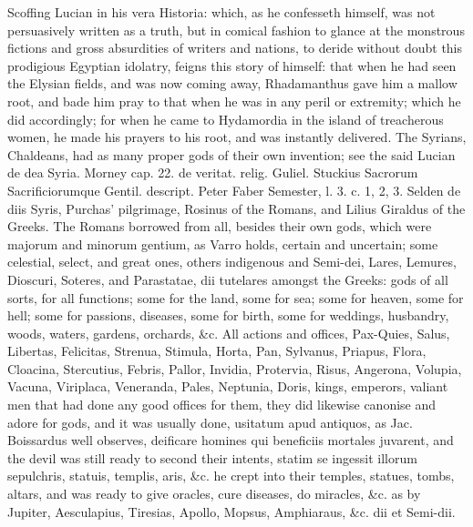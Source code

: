 {Scoffing Lucian in his vera Historia: which, as he confesseth
himself, was not persuasively written as a truth, but in comical
fashion to glance at the monstrous fictions and gross absurdities of
writers and nations, to deride without doubt this prodigious Egyptian
idolatry, feigns this story of himself: that when he had seen the
Elysian fields, and was now coming away, Rhadamanthus gave him a mallow
root, and bade him pray to that when he was in any peril or extremity;
which he did accordingly; for when he came to Hydamordia in the island
of treacherous women, he made his prayers to his root, and was
instantly delivered. The Syrians, Chaldeans, had as many proper gods of
their own invention; see the said Lucian de dea Syria. Morney cap. 22.
de veritat. relig. Guliel. Stuckius Sacrorum Sacrificiorumque
Gentil. descript. Peter Faber Semester, l. 3. c. 1, 2, 3. Selden de
diis Syris, Purchas' pilgrimage,  Rosinus of the Romans, and
Lilius Giraldus of the Greeks. The Romans borrowed from all, besides
their own gods, which were majorum and minorum gentium, as Varro holds,
certain and uncertain; some celestial, select, and great ones, others
indigenous and Semi-dei, Lares, Lemures, Dioscuri, Soteres, and
Parastatae, dii tutelares amongst the Greeks: gods of all sorts, for
all functions; some for the land, some for sea; some for heaven, some
for hell; some for passions, diseases, some for birth, some for
weddings, husbandry, woods, waters, gardens, orchards, \&c. All actions
and offices, Pax-Quies, Salus, Libertas, Felicitas, Strenua, Stimula,
Horta, Pan, Sylvanus, Priapus, Flora, Cloacina, Stercutius, Febris,
Pallor, Invidia, Protervia, Risus, Angerona, Volupia, Vacuna,
Viriplaca, Veneranda, Pales, Neptunia, Doris, kings, emperors, valiant
men that had done any good offices for them, they did likewise canonise
and adore for gods, and it was usually done, usitatum apud antiquos, as
Jac. Boissardus well observes, deificare homines qui beneficiis
mortales juvarent, and the devil was still ready to second their
intents, statim se ingessit illorum sepulchris, statuis, templis, aris,
\&c. he crept into their temples, statues, tombs, altars, and was ready
to give oracles, cure diseases, do miracles, \&c. as by Jupiter,
Aesculapius, Tiresias, Apollo, Mopsus, Amphiaraus, \&c. dii et Semi-dii.

}
